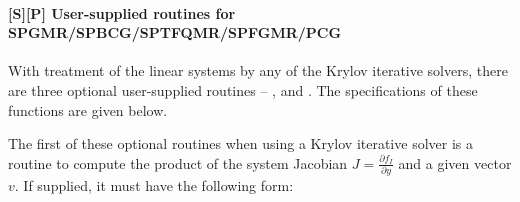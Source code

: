 \documentclass[letterpaper,10pt,english]{sphinxmanual}
\begin{document}
\paragraph{{[}\textbf{S}{]}{[}\textbf{P}{]} User-supplied routines for SPGMR/SPBCG/SPTFQMR/SPFGMR/PCG}
\label{f_interface/Usage:finterface-spilsusersupplied}\label{f_interface/Usage:s-p-user-supplied-routines-for-spgmr-spbcg-sptfqmr-spfgmr-pcg}
With treatment of the linear systems by any of the Krylov iterative
solvers, there are three optional user-supplied routines --
{\hyperref[f_interface/Usage:f/_/FARKJTIMES]{}}, {\hyperref[f_interface/Usage:f/_/FARKPSET]{}} and {\hyperref[f_interface/Usage:f/_/FARKPSOL]{}}.
The specifications of these functions are given below.

The first of these optional routines when using a Krylov iterative
solver is a routine to compute the product of the system Jacobian
$J = \frac{\partial f_I}{\partial y}$ and a given vector
$v$.  If supplied, it must have the following form:
\end{document}
